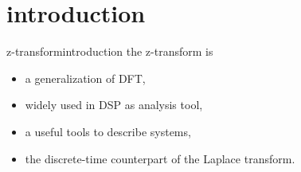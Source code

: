 



\subtitle{Part 16: z-transform}


	

\section[intro]{introduction}
	\begin{frame}{z-transform}{introduction}
        the z-transform is
        \begin{itemize}
            \item   a generalization of DFT,
            \item   widely used in DSP as analysis tool,
            \item   a useful tools to describe systems,
            \item   the discrete-time counterpart of the Laplace transform.
        \end{itemize}
	\end{frame}


